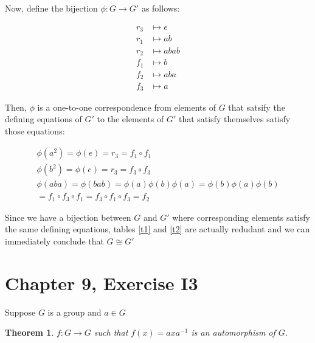 \documentclass[12pt]{article}
\newtheorem{thm}{Theorem}
\begin{document}
Now, define the bijection $\phi:G \to G'$ as follows:

\begin{align*}
	r_3 & \mapsto e \\
	r_1 & \mapsto ab \\
	r_2 & \mapsto abab \\
	f_1 & \mapsto b \\
	f_2 & \mapsto aba \\
	f_3 & \mapsto a
\end{align*}

Then, $\phi$ is a one-to-one correspondence
from elements of $G$ that satsify the defining equations of $G'$
to the elements of $G'$ that satisfy themselves satisfy those equations:

\begin{align*}
	\phi(a^2) = \phi(e) = r_3 = f_1 \circ f_1 \\
	\phi(b^2) = \phi(e) = r_3 = f_3 \circ f_3 \\
	\phi(aba) = \phi(bab) = \phi(a) \phi(b) \phi(a) = \phi(b) \phi(a) \phi(b) \\
	 = f_1 \circ f_3 \circ f_1 = f_3 \circ f_1 \circ f_3 = f_2
\end{align*}

Since we have a bijection between $G$ and $G'$
where corresponding elements satisfy the
same defining equations, tables \ref{t1} and \ref{t2}
are actually redudant and we can immediately
conclude that $G \cong G'$

\section{Chapter 9, Exercise I3}

Suppose $G$ is a group and $a \in G$

\begin{thm} \label{thm4}
	$f:G \to G$ such that $f(x) = axa^{-1}$ is an automorphism of $G$.
\end{thm}
\end{document}
